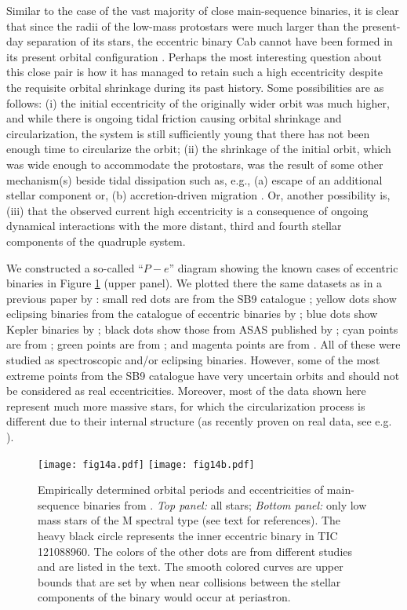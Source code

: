 \documentclass[fleqn,usenatbib]{mnras} %
\begin{document}
Similar to the case of the vast majority of close main-sequence binaries, it is clear that since the radii of the low-mass protostars were much larger than the present-day separation of its stars, the eccentric binary Cab cannot have been formed in its present orbital configuration \citep[see, e.g.][]{Kiseleva1998,Fabrycky2007}. Perhaps the most interesting question about this close pair is how it has managed to retain such a high eccentricity despite the requisite orbital shrinkage during its past history. Some possibilities are as follows: (i) the initial eccentricity of the originally wider orbit was much higher, and while there is ongoing tidal friction causing orbital shrinkage and circularization, the system is still sufficiently young that there has not been enough time to circularize the orbit; (ii) the shrinkage of the initial orbit, which was wide enough to accommodate the protostars, was the result of some other mechanism(s) beside tidal dissipation such as, e.g., (a) escape of an additional stellar component or, (b) accretion-driven migration \citep[see, e.g.][and further references therein]{TokovininMoe2020}. Or, another possibility is, (iii) that the observed current high eccentricity is a consequence of ongoing dynamical interactions with the more distant, third and fourth stellar components of the quadruple system.

We constructed a so-called ``$P-e$'' diagram showing the known cases of eccentric binaries in Figure \ref{fig:P_e} (upper panel). We plotted there the same datasets as in a previous paper by \citet{zasche21}: small red dots are from the SB9 catalogue \citep{pourbaix04}; yellow dots show eclipsing binaries from the catalogue of eccentric binaries by \cite{kim18}; blue dots show Kepler binaries by \citet{kjurkchieva17}; black dots show those from ASAS published by \cite{shivvers14}; cyan points are from \citet{halbwachs03}; green points are from \citet{triaud17}; and magenta points are from \citep{latham02}.  All of these were studied as spectroscopic and/or eclipsing binaries.  However, some of the most extreme points from the SB9 catalogue have very uncertain orbits and should not be considered as real eccentricities. Moreover, most of the data shown here represent much more massive stars, for which the circularization process is different due to their internal structure (as recently proven on real data, see e.g. \citealt{vaneylen16}).

\begin{figure}
\texttt{[image: fig14a.pdf]}
\texttt{[image: fig14b.pdf]}
\caption{Empirically determined orbital periods and eccentricities of main-sequence binaries from \citet{zasche21}. {\em Top panel:} all stars; {\em Bottom panel:} only low mass stars of the M spectral type (see text for references). The heavy black circle represents the inner eccentric binary in TIC 121088960.  The colors of the other dots are from different studies and are listed in the text. The smooth colored curves are upper bounds that are set by when near collisions between the stellar components of the binary would occur at periastron.
}
\label{fig:P_e}
\end{figure}
\end{document}
